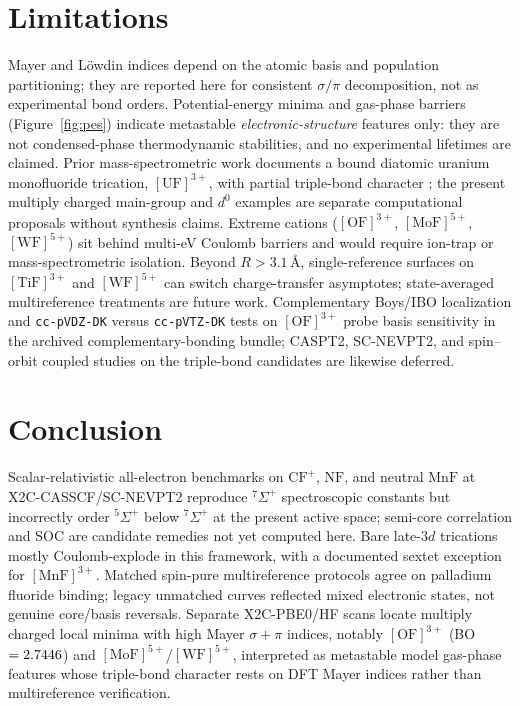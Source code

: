 \documentclass[10pt,twocolumn]{article}
\begin{document}
\section{Limitations}
Mayer and L\"owdin indices depend on the atomic basis and population partitioning; they are reported here for consistent $\sigma/\pi$ decomposition, not as experimental bond orders. Potential-energy minima and gas-phase barriers (Figure~\ref{fig:pes}) indicate metastable \emph{electronic-structure} features only: they are not condensed-phase thermodynamic stabilities, and no experimental lifetimes are claimed. Prior mass-spectrometric work documents a bound diatomic uranium monofluoride trication, $[\mathrm{UF}]^{3+}$, with partial triple-bond character \cite{schroder1999}; the present multiply charged main-group and $d^0$ examples are separate computational proposals without synthesis claims. Extreme cations ($[\mathrm{OF}]^{3+}$, $[\mathrm{MoF}]^{5+}$, $[\mathrm{WF}]^{5+}$) sit behind multi-eV Coulomb barriers and would require ion-trap or mass-spectrometric isolation. Beyond $R>3.1\,$\AA, single-reference surfaces on $[\mathrm{TiF}]^{3+}$ and $[\mathrm{WF}]^{5+}$ can switch charge-transfer asymptotes; state-averaged multireference treatments are future work. Complementary Boys/IBO localization and \texttt{cc-pVDZ-DK} versus \texttt{cc-pVTZ-DK} tests on $[\mathrm{OF}]^{3+}$ probe basis sensitivity in the archived complementary-bonding bundle; CASPT2, SC-NEVPT2, and spin--orbit coupled studies on the triple-bond candidates are likewise deferred.

\section{Conclusion}
Scalar-relativistic all-electron benchmarks on $\mathrm{CF}^+$, $\mathrm{NF}$, and neutral $\mathrm{MnF}$ at X2C-CASSCF/SC-NEVPT2 reproduce $^7\Sigma^+$ spectroscopic constants but incorrectly order $^5\Sigma^+$ below $^7\Sigma^+$ at the present active space; semi-core correlation and SOC are candidate remedies not yet computed here. Bare late-$3d$ trications mostly Coulomb-explode in this framework, with a documented sextet exception for $[\mathrm{MnF}]^{3+}$. Matched spin-pure multireference protocols agree on palladium fluoride binding; legacy unmatched curves reflected mixed electronic states, not genuine core/basis reversals. Separate X2C-PBE0/HF scans locate multiply charged local minima with high Mayer $\sigma+\pi$ indices, notably $[\mathrm{OF}]^{3+}$ (BO $=2.7446$) and $[\mathrm{MoF}]^{5+}$/$[\mathrm{WF}]^{5+}$, interpreted as metastable model gas-phase features whose triple-bond character rests on DFT Mayer indices rather than multireference verification.
\end{document}
